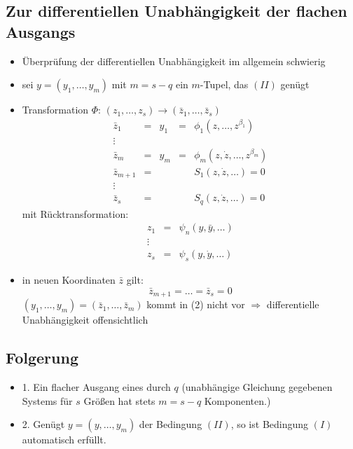 \documentclass[ngerman]{tudscrreprt}
\begin{document}
\subsection{Zur differentiellen Unabhängigkeit der flachen Ausgangs}
\begin{itemize}
\item Überprüfung der differentiellen Unabhängigkeit im allgemein schwierig
\item sei $y=(y_1, \dots, y_m)$ mit $m = s-q$ ein $m$-Tupel, das $(II)$ genügt
\item Transformation $\Phi$: $(z_1, \dots, z_s) \to (\bar z_1,\dots, \bar z_s)$
\begin{equation*}
\begin{matrix}
\bar z_1 &=& y_1 &=& \phi_1(z,\dots, z^{\beta_1})\\ 
\vdots &&&&\\
\bar z_m &=& y_m &=&\phi_m(z, \dot z, \dots,z^{\beta_m})\\
\bar z_{m+1}&=& &&S_1(z, \dot z, \dots) = 0\\ 
\vdots &&&&\\
\bar z_{s} &=& && S_q(z, \dot z, \dots) = 0  
\end{matrix}
\end{equation*}
mit Rücktransformation: 
\begin{equation*}
\begin{matrix}
z_1 &=& \psi_n(y,\bar y,\dots) \\ 
\vdots &&\\ 
z_s &=& \psi_s(y, \dot y,\dots)
\end{matrix}
\end{equation*}
\item in neuen Koordinaten $\bar z$ gilt: \begin{equation*}
\bar z_{m+1} = \dots = \bar z_s = 0 \tag{2} 
\end{equation*}
$(y_1,\dots, y_m) = (\bar z_1, \dots, \bar z_m)$ kommt in (2) nicht vor $\Rightarrow$ differentielle Unabhängigkeit offensichtlich 
\end{itemize}
\subsection*{Folgerung}
\begin{itemize}
\item{1.} Ein flacher Ausgang eines durch $q$ (unabhängige Gleichung gegebenen Systems für $s$ Größen hat stets $m=s-q$ Komponenten.)
\item{2.} Genügt $y= (y,\dots,y_m)$ der Bedingung $(II)$, so ist Bedingung $(I)$ automatisch erfüllt.
\end{itemize}
\end{document}
